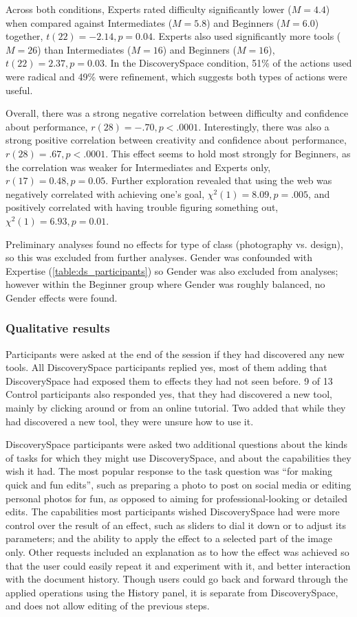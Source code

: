 Across both conditions, Experts rated difficulty significantly lower ($M = 4.4$) when compared against Intermediates ($M = 5.8$) and Beginners ($M = 6.0$) together, $t(22) = -2.14, p = 0.04$. Experts also used significantly more tools ($M = 26$) than Intermediates ($M = 16$) and Beginners ($M = 16$), $t(22) = 2.37, p = 0.03$. In the Discovery\-Space condition, 51\% of the actions used were radical and 49\% were refinement, which suggests both types of actions were useful.

Overall, there was a strong negative correlation between difficulty and confidence about performance, $r(28) = -.70, p < .0001$. Interestingly, there was also a strong positive correlation between creativity and confidence about performance, $r(28) = .67, p < .0001$.  This effect seems to hold most strongly for Beginners, as the correlation was weaker for Intermediates and Experts only, $r(17) = 0.48, p = 0.05$. Further exploration revealed that using the web was negatively correlated with achieving one's goal, $\chi^2(1) = 8.09, p = .005$, and positively correlated with having trouble figuring something out, $\chi^2(1) = 6.93, p = 0.01$.

Preliminary analyses found no effects for type of class (photography vs. design), so this was excluded from further analyses. Gender was confounded with Expertise (\autoref{table:ds_participants}) so Gender was also excluded from analyses; however within the Beginner group where Gender was roughly balanced, no Gender effects were found.

\subsubsection{Qualitative results}
Participants were asked at the end of the session if they had discovered any new tools. All Discovery\-Space participants replied yes, most of them adding that Discovery\-Space had exposed them to effects they had not seen before. 9 of 13 Control participants also responded yes, that they had discovered a new tool, mainly by clicking around or from an online tutorial. Two added that while they had discovered a new tool, they were unsure how to use it.

Discovery\-Space participants were asked two additional questions about the kinds of tasks for which they might use Discovery\-Space, and about the capabilities they wish it had. The most popular response to the task question was ``for making quick and fun edits'', such as preparing a photo to post on social media or editing personal photos for fun, as opposed to aiming for professional-looking or detailed edits. The capabilities most participants wished Discovery\-Space had were more control over the result of an effect, such as sliders to dial it down or to adjust its parameters; and the ability to apply the effect to a selected part of the image only. Other requests included an explanation as to how the effect was achieved so that the user could easily repeat it and experiment with it, and better interaction with the document history. Though users could go back and forward through the applied operations using the History panel, it is separate from Discovery\-Space, and does not allow editing of the previous steps.

